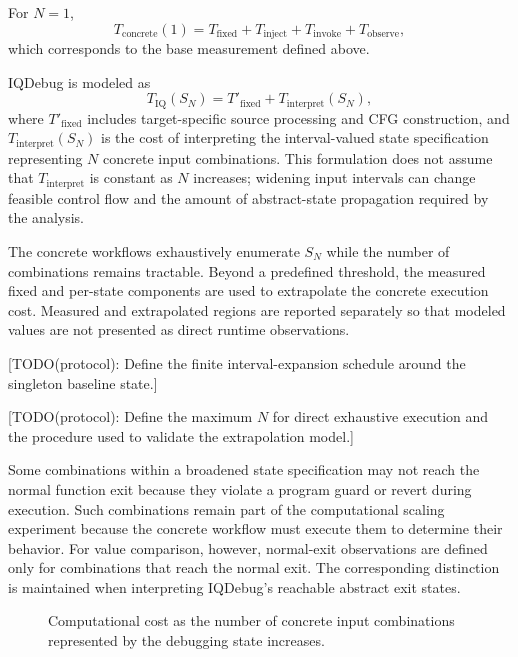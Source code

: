 \documentclass[11pt,oneside]{report}
\theoremstyle{plain}
\theoremstyle{definition}
\theoremstyle{remark}
\begin{document}
For \(N=1\),
\[
T_{\mathrm{concrete}}(1)
=
T_{\mathrm{fixed}}
+
T_{\mathrm{inject}}
+
T_{\mathrm{invoke}}
+
T_{\mathrm{observe}},
\]
which corresponds to the base measurement defined above.

IQDebug is modeled as
\[
T_{\mathrm{IQ}}(S_N)
=
T'_{\mathrm{fixed}}
+
T_{\mathrm{interpret}}(S_N),
\]
where \(T'_{\mathrm{fixed}}\) includes target-specific source processing and CFG construction, and \(T_{\mathrm{interpret}}(S_N)\) is the cost of interpreting the interval-valued state specification representing \(N\) concrete input combinations. This formulation does not assume that \(T_{\mathrm{interpret}}\) is constant as \(N\) increases; widening input intervals can change feasible control flow and the amount of abstract-state propagation required by the analysis.

The concrete workflows exhaustively enumerate \(S_N\) while the number of combinations remains tractable. Beyond a predefined threshold, the measured fixed and per-state components are used to extrapolate the concrete execution cost. Measured and extrapolated regions are reported separately so that modeled values are not presented as direct runtime observations.

[TODO(protocol): Define the finite interval-expansion schedule around the singleton baseline state.]

[TODO(protocol): Define the maximum \(N\) for direct exhaustive execution and the procedure used to validate the extrapolation model.]

Some combinations within a broadened state specification may not reach the normal function exit because they violate a program guard or revert during execution. Such combinations remain part of the computational scaling experiment because the concrete workflow must execute them to determine their behavior. For value comparison, however, normal-exit observations are defined only for combinations that reach the normal exit. The corresponding distinction is maintained when interpreting IQDebug's reachable abstract exit states.

\begin{figure}[t]
\centering
{}
\caption{Computational cost as the number of concrete input combinations
represented by the debugging state increases.}
\label{fig:eval:rq1-scaling}
\end{figure}
\end{document}
